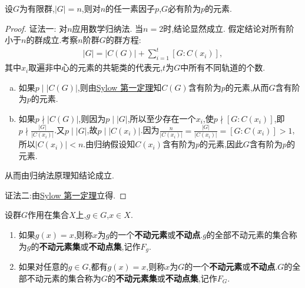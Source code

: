 \documentclass[../../main.tex]{subfiles}%
\begin{document}
\begin{theorem}[Cauchy定理]\label{theorem:抽象代数--Cauchy定理}
设$G$为有限群,$|G|=n$,则对$n$的任一素因子$p$,$G$必有阶为$p$的元素.
\end{theorem}
\begin{proof}

{\color{blue}证法一:}
对$n$应用数学归纳法.
当$n=2$时,结论显然成立.
假定结论对所有阶小于$n$的群成立.考察$n$阶群$G$的群方程:
\begin{align*}
|G| = |C(G)| + \sum_{i=1}^{t}[G:C(x_i)],
\end{align*}
其中$x_i$取遍非中心的元素的共轭类的代表元,$t$为$G$中所有不同轨道的个数.
\begin{enumerate}[(a)]
\item 如果$p\mid |C(G)|$,则由\hyperref[theorem:Sylow 第一定理]{Sylow 第一定理}知$C(G)$含有阶为$p$的元素,从而$G$含有阶为$p$的元素.

\item 如果$p\nmid |C(G)|$,则因为$p\mid |G|$,所以至少存在一个$x_i$,使$p\nmid [G:C(x_i)]$,即$p\nmid \frac{|G|}{|C(x_i)|}$.又$p\mid |G|$,故$p\mid |C(x_i)|$.因为$\frac{n}{|C(x_i)|}=\frac{|G|}{|C(x_i)|}=[G:C(x_i)]>1$,所以$|C(x_i)|<n$.由归纳假设知$C(x_i)$含有阶为$p$的元素,因此$G$含有阶为$p$的元素.
\end{enumerate}
从而由归纳法原理知结论成立.

{\color{blue}证法二:}由\hyperref[theorem:Sylow 第一定理]{Sylow 第一定理}立得.

\end{proof}

\begin{definition}
设群$G$作用在集合$X$上,$g\in G$,$x\in X$.
\begin{enumerate}[(1)]
\item 如果$g(x)=x$,则称$x$为$g$的一个\textbf{不动元素}或\textbf{不动点}.$g$的全部不动元素的集合称为$g$的\textbf{不动元素集}或\textbf{不动点集},记作$F_g$.

\item 如果对任意的$g\in G$,都有$g(x)=x$,则称$x$为$G$的一个\textbf{不动元素}或\textbf{不动点}.$G$的全部不动元素的集合称为$G$的\textbf{不动元素集}或\textbf{不动点集},记作$F_G$.
\end{enumerate}
\end{definition}
\end{document}
